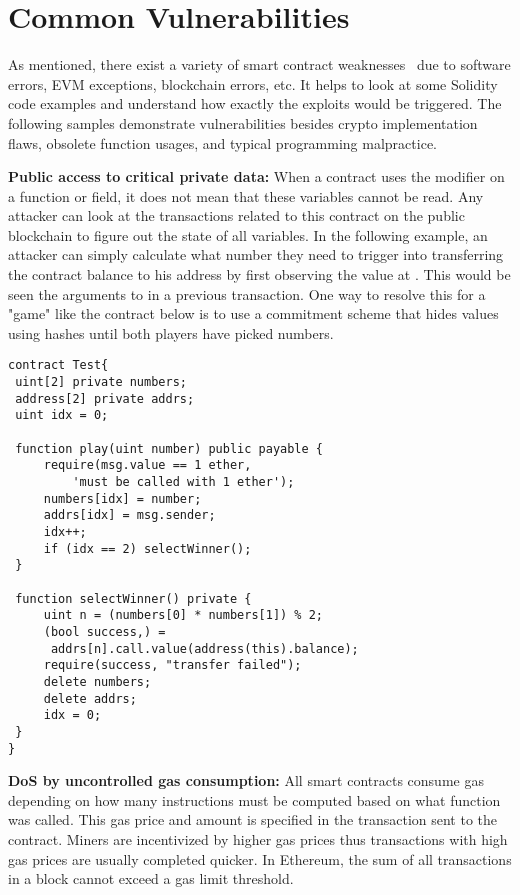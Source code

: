 \section{Common Vulnerabilities}
As mentioned, there exist a variety of smart contract weaknesses~\cite{swc} due to software errors, EVM exceptions, blockchain errors, etc.
It helps to look at some Solidity code examples and understand how exactly the exploits would be triggered.
The following samples demonstrate vulnerabilities besides crypto implementation flaws, obsolete function usages, and typical programming malpractice.

\textbf{Public access to critical private data:} When a contract uses the  modifier on a function or field, it does not mean that these variables cannot be read.
Any attacker can look at the transactions related to this contract on the public blockchain to figure out the state of all variables.
In the following example, an attacker can simply calculate what number they need to trigger  into transferring the contract balance to his address by first observing the value at .
This would be seen the arguments to  in a previous transaction.
One way to resolve this for a "game" like the contract below is to use a commitment scheme that hides values using hashes until both players have picked numbers.
\begin{lstlisting}[basicstyle=\small]
contract Test{
 uint[2] private numbers;
 address[2] private addrs;
 uint idx = 0;

 function play(uint number) public payable {
     require(msg.value == 1 ether, 
         'must be called with 1 ether');
     numbers[idx] = number;
     addrs[idx] = msg.sender;
     idx++;
     if (idx == 2) selectWinner();
 }

 function selectWinner() private {
     uint n = (numbers[0] * numbers[1]) % 2;
     (bool success,) = 
      addrs[n].call.value(address(this).balance);
     require(success, "transfer failed");
     delete numbers;
     delete addrs;
     idx = 0;
 }
}
\end{lstlisting}
\textbf{DoS by uncontrolled gas consumption:} All smart contracts consume gas depending on how many instructions must be computed based on what function was called.
This gas price and amount is specified in the transaction sent to the contract.
Miners are incentivized by higher gas prices thus transactions with high gas prices are usually completed quicker.
In Ethereum, the sum of all transactions in a block cannot exceed a gas limit threshold.
